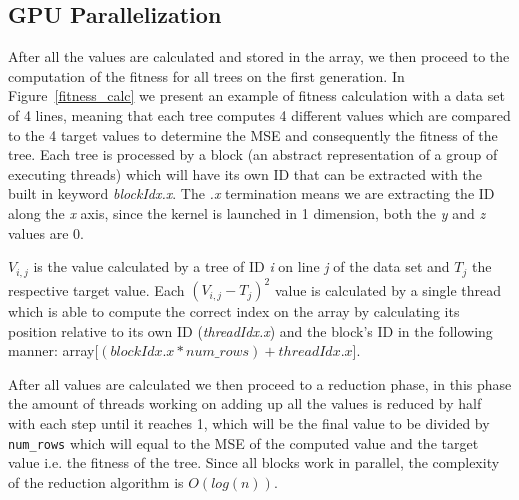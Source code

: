 \documentclass[runningheads]{llncs}
\begin{document}
\subsection{GPU Parallelization}
After all the values are calculated and stored in the array, we then proceed to the computation of the fitness for all trees on the first generation. In Figure~\ref{fitness_calc} we present an example of fitness calculation with a data set of 4 lines, meaning that each tree computes 4 different values which are compared to the 4 target values to determine the MSE and consequently the fitness of the tree. Each tree is processed by a block (an abstract representation of a group of executing threads) which will have its own ID that can be extracted with the built in keyword \textit{blockIdx.x}. The \textit{.x} termination means we are extracting the ID along the \textit{x} axis, since the kernel is launched in 1 dimension, both the \textit{y} and \textit{z} values are 0.

$V_{i,j}$ is the value calculated by a tree of ID \textit{i} on line \textit{j} of the data set and $T_{j}$ the respective target value. Each $(V_{i,j} - T_{j})^{2}$ value is calculated by a single thread which is able to compute the correct index on the array by calculating its position relative to its own ID (\textit{threadIdx.x}) and the block's ID in the following manner: array[$(blockIdx.x * num\_rows) + threadIdx.x$].

After all values are calculated we then proceed to a reduction phase, in this phase the amount of threads working on adding up all the values is reduced by half with each step until it reaches 1, which will be the final value to be divided by \texttt{num\_rows} which will equal to the MSE of the computed value and the target value i.e. the fitness of the tree. Since all blocks work in parallel, the complexity of the reduction algorithm is $O(log(n))$.
\end{document}
